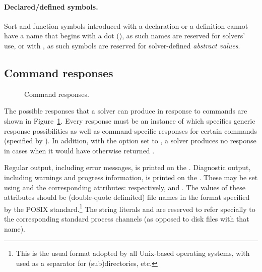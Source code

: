 \paragraph{Declared/defined symbols.}
Sort and function symbols introduced with a declaration or a definition
cannot have a name that begins with a dot (), as such names 
are reserved for solvers' use, or with , as such symbols are reserved 
for solver-defined \emph{abstract values}.

\subsection{Command responses}

\begin{figure}
\small

\cResponsesI
\bigskip

\cResponsesII

\caption{Command responses.}
\label{fig:command-responses}
\end{figure}

The possible responses that a solver can produce in response to commands are
shown in Figure~\ref{fig:command-responses}.
Every response must be an instance of  which specifies
generic response possibilities as well as command-specific responses
for certain commands (specified by ).  In
addition, with the  option set to , a solver
produces no response in cases when it would have otherwise returned .

Regular output, including error messages, is printed 
on the .
Diagnostic output, including warnings and progress information, 
is printed on the .  
These may be set using  and the corresponding attributes: 
respectively,  and . 
%
The values of these attributes should be (double-quote delimited) 
file names in the format specified by the POSIX standard.\footnote{%
This is the usual format adopted by all Unix-based operating systems,
with \ter{/} used as a separator for (sub)directories, etc.
}
The string literals  and  are reserved 
to refer specially to the corresponding standard process channels 
(as opposed to disk files with that name).

